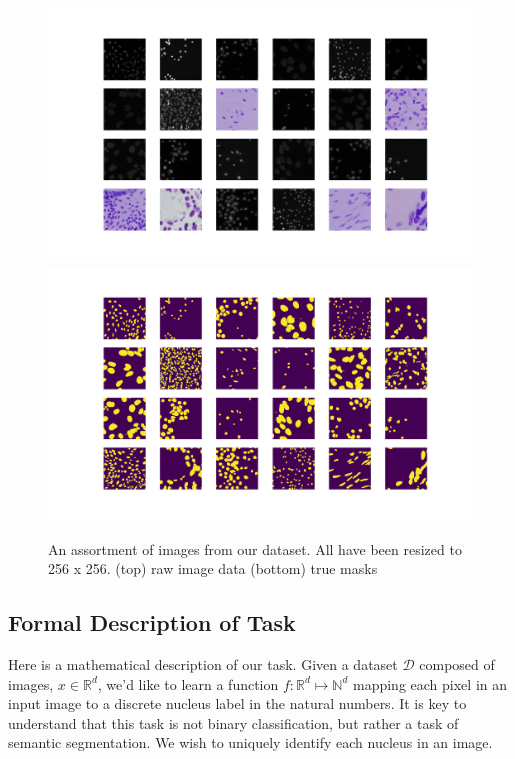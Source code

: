 \documentclass[paper=letter, fontsize=12pt]{article}
\numberwithin{equation}{section} %
\numberwithin{figure}{section} %
\numberwithin{table}{section} %
\begin{document}
\begin{figure}
    \centering
    \includegraphics[width=\textwidth]{./figs/dsbowl18-imagegrid-4x6.png}
    \includegraphics[width=\textwidth]{./figs/dsbowl18-imagegrid-masks-4x6.png}
    \caption{An assortment of images from our dataset.  All have been resized
    to 256 x 256. (top) raw image data (bottom) true masks }
    \label{fig:dsbowl18-grid}
\end{figure}

\subsection{Formal Description of Task}

Here is a mathematical description of our task.  Given a dataset $\mathcal{D}$
composed of images, $x \in \mathbb{R}^{d}$, we'd like to learn a function $f :
\mathbb{R}^{d} \mapsto \mathbb{N}^{d}$ mapping each pixel in an input image to
a discrete nucleus label in the natural numbers.  It is key to understand that
this task is not binary classification, but rather a task of semantic
segmentation.  We wish to uniquely identify each nucleus in an image.
\end{document}
